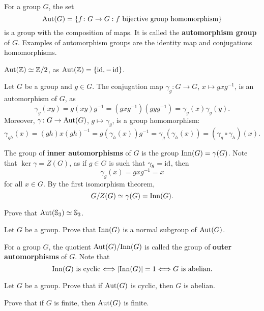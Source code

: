For a group $G$, 
the set 
\[
\operatorname{Aut}(G)=\{f\colon G\to G:f\text{ bijective group homomorphism}\}
\]
is a group with the composition of maps. It is called 
the \textbf{automorphism group} of $G$. 
Examples of automorphism groups are the identity map and 
conjugations homomorphisms. 

\begin{example}
$\operatorname{Aut}(\mathbb{Z})\simeq\mathbb{Z}/2$, as $\operatorname{Aut}(\mathbb{Z})=\{\operatorname{id},-\operatorname{id}\}$.
\end{example}

\begin{example}
Let $G$ be a group and $g\in G$. The conjugation 
map $\gamma_g\colon G\to G$, $x\mapsto gxg^{-1}$,
is an automorphism of $G$, as 
\[
\gamma_g(xy)=g(xy)g^{-1}=(gxg^{-1})(gyg^{-1})=\gamma_g(x)\gamma_g(y).
\]
Moreover, $\gamma\colon G\to\operatorname{Aut}(G)$, $g\mapsto\gamma_g$, is a group
homomorphism:
\[
\gamma_{gh}(x)=(gh)x(gh)^{-1}=g(\gamma_h(x))g^{-1}=\gamma_g(\gamma_h(x))=(\gamma_g\circ\gamma_h)(x).
\]

The group of \textbf{inner automorphisms} of $G$ is the 
group 
$\mathrm{Inn}(G)=\gamma(G)$. Note that $\ker\gamma=Z(G)$, as
if $g\in G$ is such that $\gamma_g=\operatorname{id}$, then 
\[
\gamma_g(x)=gxg^{-1}=x
\]
for all $x\in G$. By the first isomorphism theorem, 
\[
G/Z(G)\simeq \gamma(G)=\mathrm{Inn}(G).
\]
\end{example}

\begin{exercise}
\label{xca:aut(S3)}
    Prove that $\operatorname{Aut}(\mathbb{S}_3)\simeq\mathbb{S}_3$. 
\end{exercise}

\begin{exercise}
\label{xca:inner_is_normal}
    Let $G$ be a group. Prove that $\mathrm{Inn}(G)$ is a normal subgroup of $\operatorname{Aut}(G)$. 
\end{exercise} 

For a group $G$, the quotient $\operatorname{Aut}(G)/\mathrm{Inn}(G)$ is called 
the group of \textbf{outer automorphisms} of $G$. 
Note that 
\[
\mathrm{Inn}(G)\text{ is cyclic}\Longleftrightarrow
|\mathrm{Inn}(G)|=1\Longleftrightarrow
G\text{ is abelian.}
\]

\begin{exercise}
\label{xca:aut_cyclic}
Let $G$ be a group. 
Prove that if $\operatorname{Aut}(G)$ is cyclic, then 
$G$ is abelian. 
\end{exercise}

\begin{exercise}
\label{xca:aut_finite}
    Prove that if $G$ is finite, then $\operatorname{Aut}(G)$ is finite.
\end{exercise}

